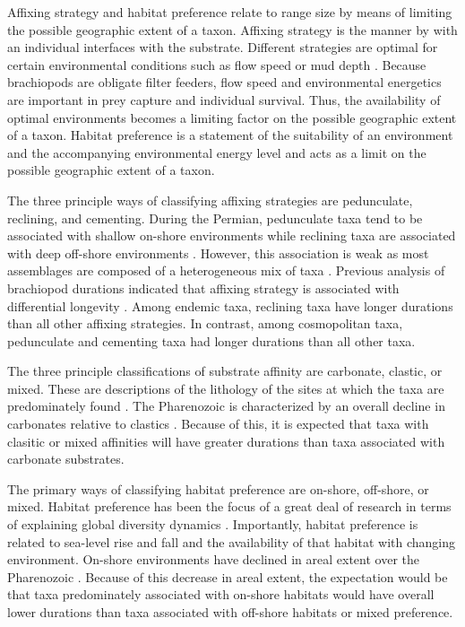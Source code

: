 \documentclass[12pt,letterpaper]{article}
\begin{document}
Affixing strategy and habitat preference relate to range size by means of limiting the possible geographic extent of a taxon. Affixing strategy is the manner by with an individual interfaces with the substrate. Different strategies are optimal for certain environmental conditions such as flow speed or mud depth \citep{Alexander1977,LaBarbera1978,LaBarbera1981}. Because brachiopods are obligate filter feeders, flow speed and environmental energetics are important in prey capture and individual survival. Thus, the availability of optimal environments becomes a limiting factor on the possible geographic extent of a taxon. Habitat preference is a statement of the suitability of an environment and the accompanying environmental energy level and acts as a limit on the possible geographic extent of a taxon. 

The three principle ways of classifying affixing strategies are pedunculate, reclining, and cementing. During the Permian, pedunculate taxa tend to be associated with shallow on-shore environments while reclining taxa are associated with deep off-shore environments \citep{Clapham2007}. However, this association is weak as most assemblages are composed of a heterogeneous mix of taxa \citep{Clapham2007}. Previous analysis of brachiopod durations indicated that affixing strategy is associated with differential longevity \citep{Alexander1977}. Among endemic taxa, reclining taxa have longer durations than all other affixing strategies. In contrast, among cosmopolitan taxa, pedunculate and cementing taxa had longer durations than all other taxa. 

The three principle classifications of substrate affinity are carbonate, clastic, or mixed. These are descriptions of the lithology of the sites at which the taxa are predominately found \citep{Foote2006,Anderson2011a,Nurnberg2013a,Kiessling2007a,Miller2001}. The Pharenozoic is characterized by an overall decline in carbonates relative to clastics \citep{Foote2006,Miller2001}. Because of this, it is expected that taxa with clasitic or mixed affinities will have greater durations than taxa associated with carbonate substrates. %

The primary ways of classifying habitat preference are on-shore, off-shore, or mixed. Habitat preference has been the focus of a great deal of research in terms of explaining global diversity dynamics \citep{Sepkoski1991,Kiessling2007a,Bottjer1988,Jablonski1991,Jablonski1983b}. Importantly, habitat preference is related to sea-level rise and fall and the availability of that habitat with changing environment. On-shore environments have declined in areal extent over the Pharenozoic \citep{Peters2008}. Because of this decrease in areal extent, the expectation would be that taxa predominately associated with on-shore habitats would have overall lower durations than taxa associated with off-shore habitats or mixed preference. 
\end{document}
